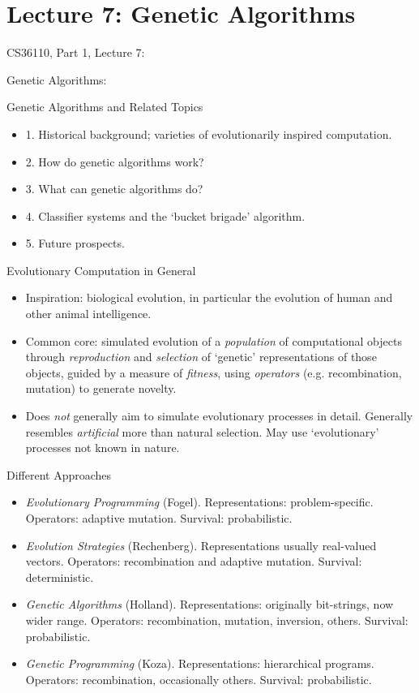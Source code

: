 \documentclass{article}
\begin{document}
\section{Lecture 7: Genetic Algorithms}
\begin{slide}{}
{\Large CS36110, Part 1, Lecture 7:}

{\Large Genetic Algorithms:}
\end{slide}

\begin{slide}{}
{\Large Genetic Algorithms and Related Topics}
\begin{itemize}
\item 1. Historical background; varieties of evolutionarily inspired
computation.
\item 2. How do genetic algorithms work?
\item 3. What can genetic algorithms do?
\item 4. Classifier systems and the `bucket brigade' algorithm.
\item 5. Future prospects.
\end{itemize}
\end{slide}

\begin{slide}{}
{\Large Evolutionary Computation in General}
\begin{itemize}
\item Inspiration: biological evolution, in particular the evolution of human
and other animal intelligence.
\item Common core: simulated evolution of a {\em
population} of computational objects
through {\em reproduction} and {\em selection} of 
`genetic' representations of those objects, guided by
a measure of {\em fitness}, using {\em operators} (e.g. recombination, 
mutation) to generate novelty. 
\item Does {\em not} generally aim to simulate evolutionary processes in
detail. Generally
resembles {\em artificial} more than natural
selection. May use `evolutionary' processes not known in nature.
\end{itemize}
\end{slide}

\begin{slide}{}
{\Large Different Approaches}
\begin{itemize}
\item {\em Evolutionary Programming} (Fogel). Representations:
problem-specific. Operators: adaptive
mutation. Survival: probabilistic.
\item {\em Evolution Strategies} (Rechenberg). Representations usually
real-valued vectors. Operators: recombination and adaptive mutation. Survival:
deterministic.
\item {\em Genetic Algorithms} (Holland). Representations: originally
bit-strings, now wider range. Operators: recombination, mutation,
inversion, others. Survival: probabilistic.
\item {\em Genetic Programming} (Koza). Representations: hierarchical
programs. Operators:
recombination, occasionally others. Survival: probabilistic.
\end{itemize}
\end{slide}
\end{document}
